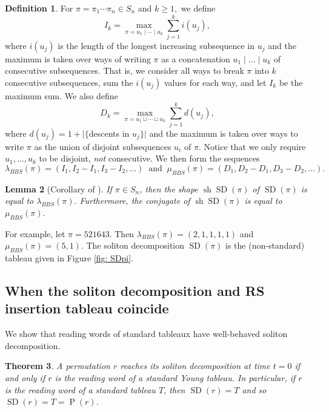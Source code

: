 \documentclass[submission]{FPSAC2021}
\theoremstyle{plain}
\newtheorem{theorem}{Theorem}[section]
\newtheorem{lemma}[theorem]{Lemma}
\theoremstyle{definition}
\newtheorem{definition}[theorem]{Definition}
\numberwithin{equation}{section}
\DeclareMathOperator{\sh}{sh}
\DeclareMathOperator{\SDself}{SD}
\DeclareMathOperator{\Ptself}{P}
\newcommand{\SD}[1]{\SDself(#1)}
\renewcommand{\P}[1]{\Ptself(#1)}
\begin{document}
\begin{definition}
\label{defn: lambda and mu}
    For $\pi = \pi_1\cdots\pi_n\in S_n$ and $k\geq 1,$ we define \[
    I_k = \max_{\pi=u_1\mid\cdots\mid u_k}\sum_{j=1}^k i(u_j), \]
    where $i(u_j)$ is the length of the longest increasing subsequence in $u_j$ and the maximum is taken over ways of writing $\pi$ as a concatenation $u_1 \mid \dots \mid u_k$ of consecutive subsequences. 
    That is, we consider all ways to break $\pi$ into $k$ consecutive subsequences, sum the $i(u_j)$ values for each way, and let $I_k$ be the maximum sum. 
    We also define 
    \[ D_k = \max_{\pi= u_1 \sqcup \cdots \sqcup u_k} \sum_{j=1}^k d(u_j),\] where $d(u_j)= 1+|\{$descents in $u_j\}|$ 
    and the maximum is taken over
    ways to write $\pi$ as the union of 
    disjoint subsequences $u_i$ of $\pi$. 
    Notice that we only require $u_1,\dots, u_k$ to be disjoint, \emph{not} consecutive. We then form the sequences $$\lambda_{BBS}(\pi) = (I_1,I_2-I_1,I_3-I_2,\dots) ~ \text{ and } ~ \mu_{BBS}(\pi) = (D_1,D_2-D_1,D_3-D_2,\dots).$$
\end{definition}


\begin{lemma}[Corollary of {\cite[Lemma 2.1]{LLPS19}}]
\label{Lem: R_k gives SD shape}
        If $\pi\in S_n$, then  the shape $\sh \SD \pi$ of $\SD\pi$ is equal to $\lambda_{BBS}(\pi).$ Furthermore, the  conjugate of $\sh\SD\pi$ is equal to $\mu_{BBS}(\pi).$
\end{lemma}
        
        
For example, let $\pi = 521643$. Then $\lambda_{BBS}(\pi)=(2,1,1,1,1)$ and $\mu_{BBS}(\pi)=(5,1)$. The soliton decomposition $\SD{\pi}$ is the (non-standard) tableau given in Figure \ref{fig: SDpi}. 

\subsection{When the soliton decomposition and RS insertion tableau coincide}

We show that reading words of standard tableaux have well-behaved soliton decomposition. 

\begin{theorem}
\label{Thm: forwards t = 0}
A permutation $r$ reaches its soliton decomposition at time $t=0$ if and only if $r$ is the reading word of a standard Young tableau. 
In particular, if $r$ is the reading word of a standard tableau $T$, then $\SD{r}=T$ and so $\SD{r}=T=\P{r}$. 
\end{theorem}
\end{document}
